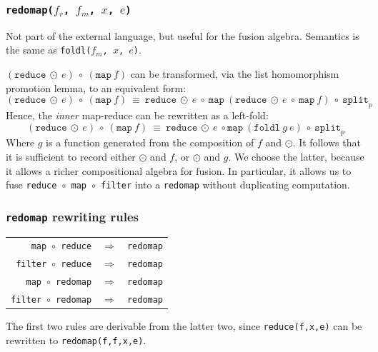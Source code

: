 \documentclass{beamer}
\begin{document}
\begin{frame}[fragile,t]
  \frametitle{  \texttt{redomap($f_{r}$, $f_{m}$, $x$, $e$)}}

  Not part of the external language, but useful for the fusion
  algebra.  Semantics is the same as \texttt{\tt foldl($f_{m}$, $x$, $e$)}.

  $(\texttt{reduce}\ \odot\ e)\ \circ\ (\texttt{map}\ f)$ can be
  transformed, via the list homomorphism promotion lemma, to an
  equivalent form:
  \[
  (\texttt{reduce}\ \odot\ e)\ \circ\ (\texttt{map}\ f)\
  {\equiv}\ \texttt{reduce}\ \odot\
  e\ \circ\ \texttt{map}\ ({\texttt{reduce}\ \odot\ e\ \circ\ \texttt{map}\ f})\ \circ\ \texttt{split}_{p}
  \]
  Hence, the \textit{inner} map-reduce can be rewritten as a left-fold:
  \[
  (\texttt{reduce}\ \odot\ e)\ \circ\ (\texttt{map}\ f)\
  {\equiv}\ \texttt{reduce}\ \odot\
  e\ \circ \texttt{map} \ ({\texttt{foldl}\ g\ e})\ \circ\ \texttt{split}_{p}
  \]
  Where $g$ is a function generated from the composition of $f$ and
  $\odot$.  It follows that it is sufficient to record either $\odot$
  and $f$, or $\odot$ and $g$. We choose the latter, because it allows
  a richer compositional algebra for fusion.  In particular, it allows
  us to fuse \texttt{reduce~$\circ$~map~$\circ$~filter} into a
  \texttt{redomap} without duplicating computation.
\end{frame}

\begin{frame}
\frametitle{\texttt{redomap} rewriting rules}

\begin{center}
\begin{tabular}{rcl}
\texttt{map $\circ$ reduce}    & $\Rightarrow$ & \texttt{redomap} \\
\texttt{filter $\circ$ reduce}    & $\Rightarrow$ & \texttt{redomap} \\
\texttt{map $\circ$ redomap}    & $\Rightarrow$ & \texttt{redomap} \\
\texttt{filter $\circ$ redomap}    & $\Rightarrow$ & \texttt{redomap} \\
\end{tabular}
\end{center}

The first two rules are derivable from the latter two, since
\texttt{reduce(f,x,e)} can be rewritten to \texttt{redomap(f,f,x,e)}.

\end{frame}
\end{document}
